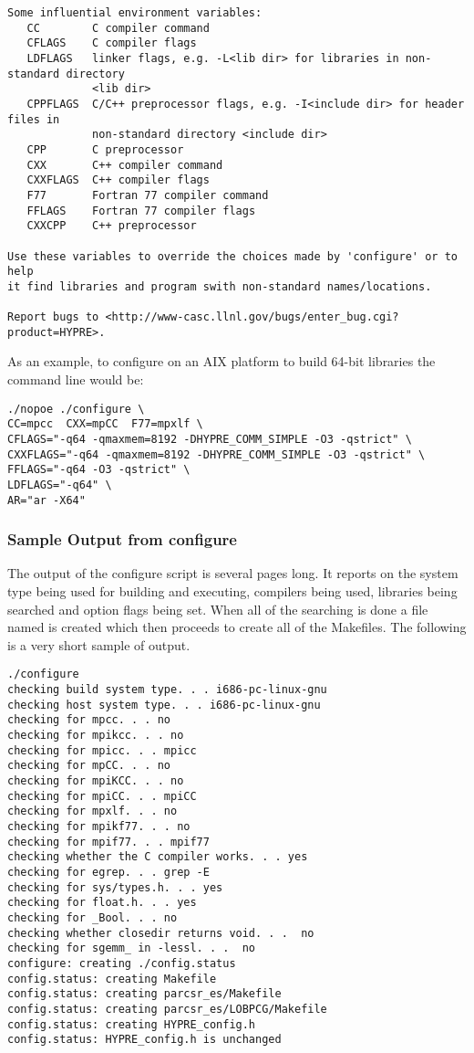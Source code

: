 \begin{verbatim}
Some influential environment variables:
   CC        C compiler command
   CFLAGS    C compiler flags
   LDFLAGS   linker flags, e.g. -L<lib dir> for libraries in non-standard directory 
             <lib dir>
   CPPFLAGS  C/C++ preprocessor flags, e.g. -I<include dir> for header files in
             non-standard directory <include dir>
   CPP       C preprocessor
   CXX       C++ compiler command
   CXXFLAGS  C++ compiler flags
   F77       Fortran 77 compiler command
   FFLAGS    Fortran 77 compiler flags
   CXXCPP    C++ preprocessor

Use these variables to override the choices made by 'configure' or to help
it find libraries and program swith non-standard names/locations.

Report bugs to <http://www-casc.llnl.gov/bugs/enter_bug.cgi?product=HYPRE>.
\end{verbatim}


As an example, to configure \hypre{} on an AIX platform to build 64-bit libraries
the command line would be:
\begin{verbatim}
./nopoe ./configure \
CC=mpcc  CXX=mpCC  F77=mpxlf \
CFLAGS="-q64 -qmaxmem=8192 -DHYPRE_COMM_SIMPLE -O3 -qstrict" \
CXXFLAGS="-q64 -qmaxmem=8192 -DHYPRE_COMM_SIMPLE -O3 -qstrict" \
FFLAGS="-q64 -O3 -qstrict" \
LDFLAGS="-q64" \
AR="ar -X64"
\end{verbatim}

\subsubsection{Sample Output from configure}
\label{Sample Output from configure}

The output of the configure script is several pages long.  It reports on the 
system type being used for building and executing, compilers being used, libraries
being searched and option flags being set.  When all of the searching is done a 
file named \file{config.status} is created which then proceeds to create all of 
the Makefiles.  The following is a very short sample of  output.
\begin{verbatim}
./configure
checking build system type. . . i686-pc-linux-gnu
checking host system type. . . i686-pc-linux-gnu
checking for mpcc. . . no
checking for mpikcc. . . no
checking for mpicc. . . mpicc
checking for mpCC. . . no
checking for mpiKCC. . . no
checking for mpiCC. . . mpiCC
checking for mpxlf. . . no
checking for mpikf77. . . no
checking for mpif77. . . mpif77
checking whether the C compiler works. . . yes
checking for egrep. . . grep -E
checking for sys/types.h. . . yes
checking for float.h. . . yes
checking for _Bool. . . no
checking whether closedir returns void. . .  no
checking for sgemm_ in -lessl. . .  no
configure: creating ./config.status
config.status: creating Makefile
config.status: creating parcsr_es/Makefile
config.status: creating parcsr_es/LOBPCG/Makefile
config.status: creating HYPRE_config.h
config.status: HYPRE_config.h is unchanged

\end{verbatim}

